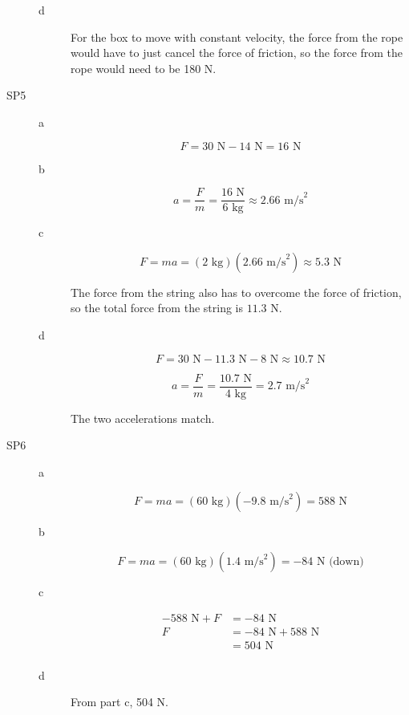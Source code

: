 \documentclass{exam}
\begin{document}
\begin{description}
\begin{description}
\item[d]
For the box to move with constant velocity, the force from the rope would have to just cancel the force of friction, so
the force from the rope would need to be 180 N.

\end{description}

\pagebreak

\item[SP5]

\begin{description}
\item[a]
\[
  F = 30 \text{ N} - 14 \text{ N} = 16 \text{ N}
\]

\item[b]
\[
  a = \frac{F}{m} = \frac{16 \text{ N}}{6 \text{ kg}} \approx 2.66 \text{ m/s}^2
\]

\item[c]
\[
  F = ma = (2 \text{ kg})(2.66 \text{ m/s}^2) \approx 5.3 \text{ N}
\]

The force from the string also has to overcome the force of friction, so the total force from the string is $11.3 \text{ N}$.

\item[d]
\[
  F = 30 \text{ N} - 11.3 \text{ N} - 8 \text{ N} \approx 10.7 \text{ N}
\]

\[
  a = \frac{F}{m} = \frac{10.7 \text{ N}}{4 \text{ kg}} = 2.7 \text{ m/s}^2
\]

The two accelerations match. 

\end{description}

\item[SP6]

\begin{description}
\item[a]
\[
  F = ma = (60 \text{ kg})(-9.8 \text{ m/s}^2) = 588 \text{ N}
\]

\item[b]
\[
  F = ma = (60 \text{ kg})(1.4 \text{ m/s}^2) = -84 \text{ N (down)}
\]

\item[c]
\begin{align*}
  -588 \text{ N} + F &= -84 \text{ N} \\
  F &=  -84 \text{ N} + 588 \text{ N} \\
   &=  504 \text{ N} \\
\end{align*}

\item[d]
From part c, 504 N.


\end{description}
\end{description}
\end{document}
